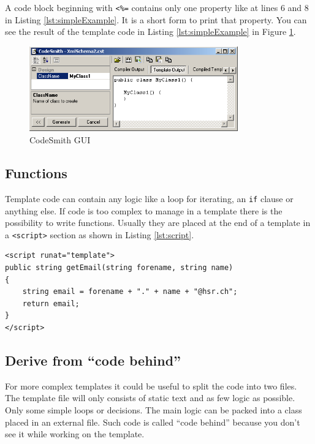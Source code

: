 A code block beginning with \verb~<%=~ contains only one property like at 
lines 6 and 8 in Listing \ref{lst:simpleExample}. It is a short form to 
print that property. You can see the result of the template code in Listing 
\ref{lst:simpleExample} in Figure \ref{fig:codesmithGUI}.

\begin{figure}[H]
	\begin{center}
		\includegraphics[width=9cm]{./files/inc/figures/codesmithGUI}
		\caption{\label{fig:codesmithGUI}CodeSmith GUI}
	\end{center}
\end{figure}


\subsection{Functions}
Template code can contain any logic like a loop for iterating, an 
\verb~if~ clause or anything else. If code is too complex to manage 
in a template there is the possibility to write functions. Usually 
they are placed at the end of a template in a \verb~<script>~ section 
as shown in Listing \ref{lst:script}.

\begin{lstlisting}[float,caption=$<$script$>$ section,label=lst:script]
<script runat="template">
public string getEmail(string forename, string name)
{
	string email = forename + "." + name + "@hsr.ch";
	return email;
}
</script>\end{lstlisting}


\subsection{Derive from ``code behind''}
For more complex templates it could be useful to split the code into two 
files. The template file will only consists of static text and as few logic 
as possible. Only some simple loops or decisions. The main logic can be 
packed into a class placed in an external file. Such code is called ``code 
behind'' because you don't see it while working on the template.

